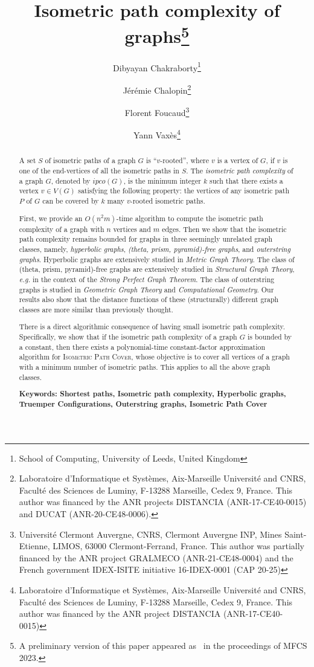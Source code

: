 \documentclass[a4paper]{article}
\title{Isometric path complexity of graphs\footnote{A preliminary version of this paper appeared as~\cite{shortversion} in the proceedings of MFCS 2023.}}
\author{Dibyayan Chakraborty\footnote{School of Computing, University of Leeds, United Kingdom} \and Jérémie Chalopin\footnote{Laboratoire d'Informatique et Systèmes, Aix-Marseille Université and CNRS, Faculté des Sciences de Luminy, F-13288 Marseille, Cedex 9, France. This author was financed by the ANR projects DISTANCIA (ANR-17-CE40-0015) and DUCAT (ANR-20-CE48-0006).}
\and Florent Foucaud\footnote{Université Clermont Auvergne, CNRS, Clermont Auvergne INP, Mines Saint-Etienne, LIMOS, 63000 Clermont-Ferrand, France. This author was partially financed by the ANR project GRALMECO (ANR-21-CE48-0004) and the French government IDEX-ISITE initiative 16-IDEX-0001 (CAP 20-25)} \and Yann Vax\`{e}s\footnote{Laboratoire d'Informatique et Systèmes, Aix-Marseille Université and CNRS, Faculté des Sciences de Luminy, F-13288 Marseille, Cedex 9, France. This author was financed by the ANR project DISTANCIA (ANR-17-CE40-0015)} }
\newcommand{\IPC}{\textsc{Isometric Path Cover}\xspace}
\newcommand{\ipco}[1]{ipco\left(#1\right)}
\begin{document}
\maketitle




\begin{abstract}

A set $S$ of isometric paths of a graph $G$ is ``$v$-rooted'', where $v$ is a vertex of $G$, if $v$ is one of the end-vertices of all the isometric paths in $S$. The \emph{isometric path complexity} of a graph $G$, denoted by $\ipco{G}$, is the minimum integer $k$ such that there exists a vertex $v\in V(G)$ satisfying the following property: the vertices of any isometric path $P$ of $G$ can be covered by $k$ many $v$-rooted isometric paths.

First, we provide an $O(n^2 m)$-time algorithm to compute the isometric path complexity of a graph with $n$ vertices and $m$ edges. Then we show that the isometric path complexity remains bounded for graphs in three seemingly unrelated graph classes, namely, \emph{hyperbolic graphs}, \emph{(theta, prism, pyramid)-free graphs}, and \emph{outerstring graphs}. Hyperbolic graphs are extensively studied in \emph{Metric Graph Theory}. The class of (theta, prism, pyramid)-free graphs are extensively studied in \emph{Structural Graph Theory}, \textit{e.g.} in the context of the \emph{Strong Perfect Graph Theorem}. The class of outerstring graphs is studied in \emph{Geometric Graph Theory} and \emph{Computational Geometry}. Our results also show that the distance functions of these (structurally) different graph classes are more similar than previously thought.



There is a direct algorithmic consequence of having small isometric path complexity. Specifically, we show that if the isometric path complexity of a graph $G$ is bounded by a constant, then there exists a polynomial-time constant-factor approximation algorithm for \IPC, whose objective is to cover all vertices of a graph with a minimum number of isometric paths. This applies to all the above graph classes. 

\medskip\noindent\textbf{Keywords: Shortest paths, Isometric path complexity, Hyperbolic graphs, Truemper Configurations, Outerstring graphs, Isometric Path Cover}
\end{abstract}
\end{document}
